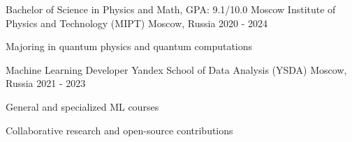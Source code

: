 
\begin{cventries}
  \cventry
    {Bachelor of Science in Physics and Math, GPA: 9.1/10.0} %
    {Moscow Institute of Physics and Technology (MIPT)} %
    {Moscow, Russia} %
    {2020 - 2024} %
    {
        \begin{cvitems}
         \item {Majoring in quantum physics and quantum computations}
        \end{cvitems}
    }
    
  \cventry
    {Machine Learning Developer}
    {Yandex School of Data Analysis (YSDA)}
    {Moscow, Russia}
    {2021 - 2023}
    {
       \begin{cvitems} %
        \item { General and specialized ML courses  }
        \item { Collaborative research and open-source contributions }
      \end{cvitems}
    }
\end{cventries}
